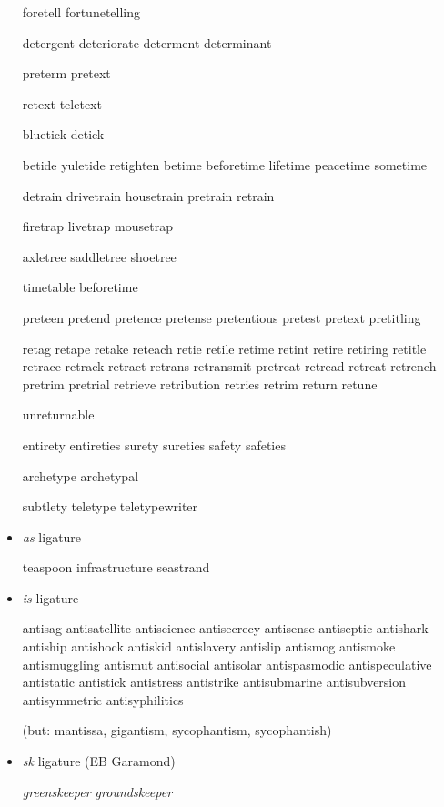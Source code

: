 \begin{itemize}
foretell fortunetelling

detergent deteriorate determent determinant 

preterm pretext 

retext teletext

bluetick detick

betide yuletide retighten betime beforetime lifetime peacetime sometime

detrain drivetrain housetrain pretrain retrain 

firetrap livetrap mousetrap 

axletree saddletree shoetree

timetable beforetime 

preteen pretend pretence pretense pretentious pretest pretext pretitling 

retag retape retake reteach retie retile retime retint retire retiring retitle retrace retrack retract retrans retransmit pretreat retread retreat retrench pretrim pretrial retrieve retribution retries retrim return retune 

unreturnable

entirety entireties surety sureties safety safeties

archetype archetypal

subtlety teletype teletypewriter

\egroup


\item \emph{as} ligature

\bgroup \em

teaspoon infrastructure seastrand 

\egroup


\item \emph{is} ligature

\bgroup \em

antisag antisatellite antiscience antisecrecy antisense antiseptic antishark antiship antishock antiskid antislavery antislip antismog antismoke antismuggling antismut antisocial antisolar antispasmodic antispeculative antistatic antistick antistress antistrike antisubmarine antisubversion antisymmetric antisyphilitics 

(but: mantissa, gigantism, sycophantism, sycophantish)

\egroup

\item {\ebg\emph{sk}} ligature (EB Garamond)

\bgroup \ebg \em
greenskeeper groundskeeper 


\end{itemize}
